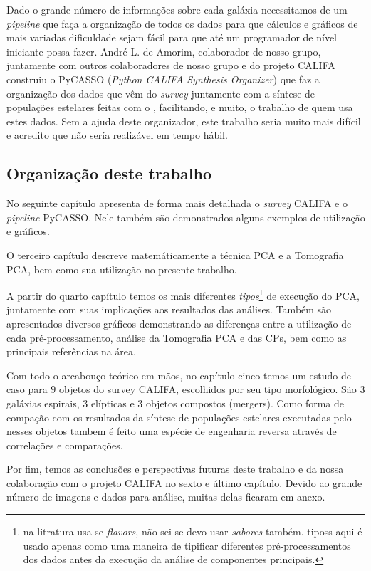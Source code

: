 Dado o grande número de informações sobre cada galáxia necessitamos de um {\em
pipeline} que faça a organização de todos os dados para que cálculos e gráficos
de mais variadas dificuldade sejam fácil para que até um programador de nível
iniciante possa fazer. André L. de Amorim, colaborador de nosso grupo,
juntamente com outros colaboradores de nosso grupo e do projeto CALIFA construiu
o PyCASSO ({\em Python CALIFA \starlight Synthesis Organizer})
\citep[][ cap. 4]{CidFernandes2013a} que faz a organização dos dados que vêm
do {\em survey} juntamente com a síntese de populações estelares feitas com o
\starlight, facilitando, e muito, o trabalho de quem usa estes dados. Sem a
ajuda deste organizador, este trabalho seria muito mais difícil e acredito que
não sería realizável em tempo hábil.

\subsection{Organização deste trabalho}

No seguinte capítulo apresenta de forma mais detalhada o {\em survey} CALIFA e o
{\em pipeline} PyCASSO. Nele também são demonstrados alguns exemplos de
utilização e gráficos.

O terceiro capítulo descreve matemáticamente a técnica PCA e a Tomografia PCA,
bem como sua utilização no presente trabalho. 

A partir do quarto capítulo temos os mais diferentes {\em tipos}\footnote{\ojo
na litratura usa-se {\em flavors}, não sei se devo usar {\em sabores} também.
tiposs aqui é usado apenas como uma maneira de tipificar diferentes
pré-processamentos dos dados antes da execução da análise de componentes
principais.} de execução do PCA, juntamente com suas implicações aos resultados
das análises. Também são apresentados diversos gráficos demonstrando as
diferenças entre a utilização de cada pré-processamento, análise da
Tomografia PCA e das CPs, bem como as principais referências na área.

Com todo o arcabouço teórico em mãos, no capítulo cinco temos um estudo de caso
para $9$ objetos do survey CALIFA, escolhidos por seu tipo morfológico. São $3$
galáxias espirais, $3$ elípticas e $3$ objetos compostos (mergers). Como forma
de compação com os resultados da síntese de populações estelares executadas pelo
\starlight nesses objetos tambem é feito uma espécie de engenharia reversa
através de correlações e comparações.

Por fim, temos as conclusões e perspectivas futuras deste trabalho e da nossa
colaboração com o projeto CALIFA no sexto e último capítulo. \ojo Devido ao
grande número de imagens e dados para análise, muitas delas ficaram em anexo.

